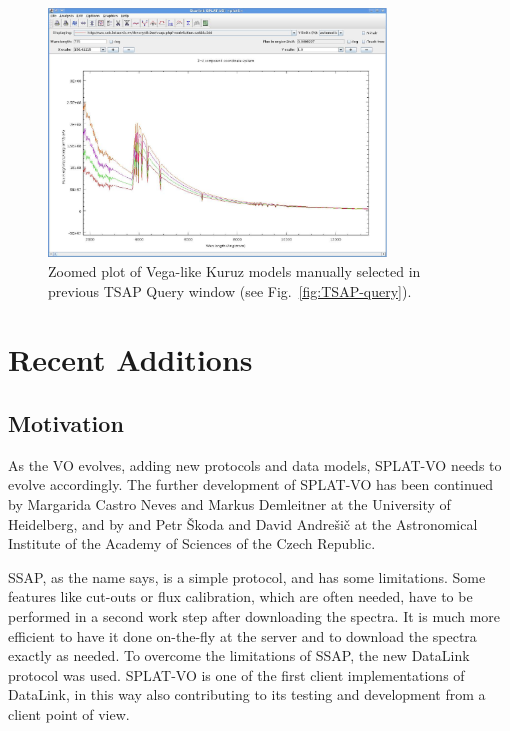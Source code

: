 \documentclass[final,authoryear,5p,times,twocolumn]{elsarticle}
\begin{document}
\begin{figure}[t]
\begin{center}
\includegraphics[width=0.8\textwidth]{TSSA-plot.pdf}
\caption{Zoomed plot of Vega-like Kuruz models manually selected in previous
TSAP Query window (see Fig.~\ref{fig:TSAP-query}). }
\label{fig:TSAP-plot}
\end{center}
\end{figure}



\section{Recent Additions}


\subsection{Motivation}

As the VO evolves, adding new protocols and data models, SPLAT-VO
needs to evolve accordingly.  The further development of SPLAT-VO has
been continued by Margarida Castro Neves and Markus Demleitner at the
University of Heidelberg, and by and Petr \v{S}koda and David Andre\v{s}i\v{c} at
the Astronomical Institute of the Academy of Sciences of the Czech
Republic.

SSAP, as the name says, is a simple protocol, and has some limitations. Some
features like cut-outs or flux calibration, which are often needed, have to be
performed in a second work step after downloading the spectra. It is much more
efficient to have it done on-the-fly at the server and  to download the
spectra exactly as needed. To overcome the limitations of SSAP, the new
DataLink protocol \citep{datalink} was used. SPLAT-VO is one of the first
client implementations of DataLink, in this way also contributing to its
testing and development from a client point of view.
\end{document}
